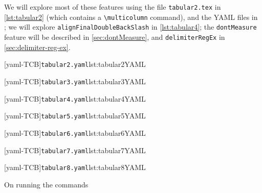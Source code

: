  \begin{example}
 We will explore most of these features using the file \texttt{tabular2.tex} in
 \cref{lst:tabular2} (which contains a \lstinline!\multicolumn! command), and the YAML
 files in ; we will explore
 \texttt{alignFinalDoubleBackSlash} in \cref{lst:tabular4}; the \texttt{dontMeasure}
 feature will be described in \cref{sec:dontMeasure}, and \texttt{delimiterRegEx} in
 \cref{sec:delimiter-reg-ex}.

 \begin{minipage}{.45\textwidth}
  [yaml-TCB]{\texttt{tabular2.yaml}}{lst:tabular2YAML}
 \end{minipage}%
 \hfill
 \begin{minipage}{.48\textwidth}
  [yaml-TCB]{\texttt{tabular3.yaml}}{lst:tabular3YAML}
 \end{minipage}%

 \begin{minipage}{.45\textwidth}
  [yaml-TCB]{\texttt{tabular4.yaml}}{lst:tabular4YAML}
 \end{minipage}%
 \hfill
 \begin{minipage}{.48\textwidth}
  [yaml-TCB]{\texttt{tabular5.yaml}}{lst:tabular5YAML}
 \end{minipage}%

 \begin{minipage}{.45\textwidth}
  [yaml-TCB]{\texttt{tabular6.yaml}}{lst:tabular6YAML}
 \end{minipage}%
 \hfill
 \begin{minipage}{.48\textwidth}
  [yaml-TCB]{\texttt{tabular7.yaml}}{lst:tabular7YAML}
 \end{minipage}%

 \begin{minipage}{.48\textwidth}
  [yaml-TCB]{\texttt{tabular8.yaml}}{lst:tabular8YAML}
 \end{minipage}%

 On running the commands  


\end{example}
